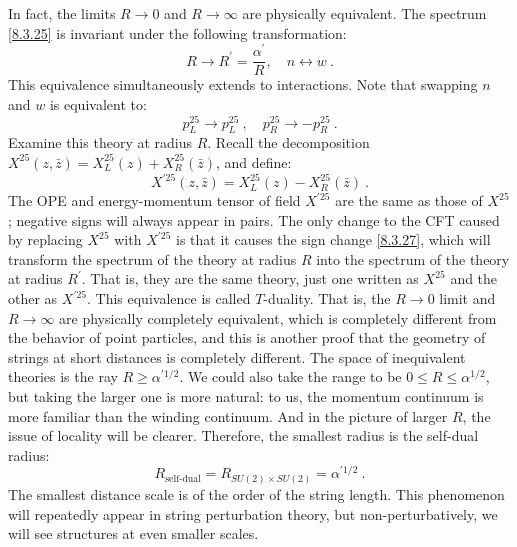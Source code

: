 In fact, the limits $R \rightarrow 0$ and $R \rightarrow \infty$ are physically equivalent. 
The spectrum \eqref{8.3.25} is invariant under the following transformation:
\begin{equation}
	R \rightarrow R^{\prime}=\frac{\alpha^{\prime}}{R}, \quad n \leftrightarrow w \:. \label{8.3.26}
\end{equation}
This equivalence simultaneously extends to interactions. 
Note that swapping $n$ and $w$ is equivalent to:
\begin{equation}
	p_{L}^{25} \rightarrow p_{L}^{25}\:, \quad p_{R}^{25} \rightarrow-p_{R}^{25} \:. \label{8.3.27}
\end{equation}
Examine this theory at radius $R$. Recall the decomposition $X^{25}(z, \bar{z})=X_{L}^{25}(z)+X_{R}^{25}(\bar{z})$, and define:
\begin{equation}
	X^{\prime 25}(z, \bar{z})=X_{L}^{25}(z)-X_{R}^{25}(\bar{z}) \:. \label{8.3.28}
\end{equation}
The OPE and energy-momentum tensor of field $X^{\prime 25}$ are the same as those of $X^{25}$; negative signs will always appear in pairs. The only change to the CFT caused by replacing $X^{25}$ with $X^{\prime 25}$ is that it causes the sign change \eqref{8.3.27}, which will transform the spectrum of the theory at radius $R$ into the spectrum of the theory at radius $R^{\prime}$. That is, they are the same theory, just one written as $X^{25}$ and the other as $X^{\prime 25} $. 
This equivalence is called $T$-duality. That is, the $R \rightarrow 0$ limit and $R \rightarrow \infty$ are physically completely equivalent, which is completely different from the behavior of point particles, and this is another proof that the geometry of strings at short distances is completely different. The space of inequivalent theories is the ray $R \geq \alpha^{\prime 1 / 2} $. 
We could also take the range to be $0 \leq R \leq \alpha^{1 / 2}$, but taking the larger one is more natural: to us, the momentum continuum is more familiar than the winding continuum. 
And in the picture of larger $R$, the issue of locality will be clearer. Therefore, the smallest radius is the self-dual radius:
\begin{equation}
	R_{\text{self-dual}}=R_{SU(2) \times SU(2)}=\alpha^{\prime 1/2} \:. \label{8.3.29}
\end{equation}
The smallest distance scale is of the order of the string length.
This phenomenon will repeatedly appear in string perturbation theory, but non-perturbatively, we will see structures at even smaller scales. 


